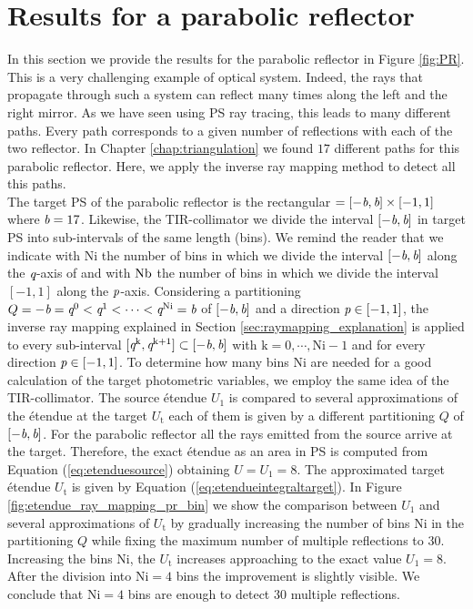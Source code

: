 \section{Results for a parabolic reflector}\label{sec:PR}
In this section we provide the results for the parabolic reflector in Figure \ref{fig:PR}.
This is a very challenging example of optical system. Indeed, the rays that propagate through such a system can reflect many times along the left and the right mirror. As we have seen using PS ray tracing, this leads to many different paths. Every path corresponds to a given number of reflections with each of the two reflector. In Chapter \ref{chap:triangulation} we found $17$ different paths for this parabolic reflector. Here, we apply the inverse ray mapping method to detect all this paths. \\ \indent
The target PS of the parabolic reflector is the rectangular $=[-\textit{b}, \textit{b}]\times[-1,1]$ where $\textit{b}=17$. Likewise, the TIR-collimator we divide the interval $[-\textit{b}, \textit{b}]$ in target PS into sub-intervals of the same length (bins). We remind the reader that we indicate with $\textrm{Ni}$ the number of bins in which we divide the interval $[-\textit{b}, \textit{b}]$ along the $\textit{q}$-axis of  and with $\textrm{Nb}$ the number of bins in which we divide the interval $[-1,1]$ along the $\textit{p}$-axis. Considering a partitioning $Q = -\textit{b}=\textit{q}^{0}<\textit{q}^{1}<\cdots<\textit{q}^{\textrm{Ni}}=\textit{b}$ of $[-\textit{b}, \textit{b}]$ and a direction $\textit{p}\in[-1,1]$, the inverse ray mapping explained in Section \ref{sec:raymapping_explanation} is applied to every sub-interval $[\textit{q}^{\textrm{k}}, \textit{q}^{\textrm{k+1}}]\subset[-\textit{b}, \textit{b}]$ with $\textrm{k}=0, \cdots, \textrm{Ni}-1$ and for every direction $\textit{p}\in[-1,1]$. To determine how many bins $\textrm{Ni}$ are needed for a good calculation of the target photometric variables, we employ the same idea of the TIR-collimator. The source \'{e}tendue $U_1$ is compared to several approximations of the \'{e}tendue at the target $U_{\textrm{t}}$ each of them is given by a different partitioning $Q$ of $[-\textit{b}, \textit{b}]$. For the parabolic reflector all the rays emitted from the source arrive at the target. Therefore, the exact \'{e}tendue as an area in PS is computed from Equation (\ref{eq:etenduesource}) obtaining $U=U_1=8$. The approximated target \'{e}tendue $U_{\textrm{t}}$ is given by Equation (\ref{eq:etendueintegraltarget}). In Figure \ref{fig:etendue_ray_mapping_pr_bin} we show the comparison between $U_1$ and several approximations of $U_{\textrm{t}}$ by gradually increasing the number of bins $\textrm{Ni}$ in the partitioning $Q$ while fixing the maximum number of multiple reflections to $30$. Increasing the bins $\textrm{Ni}$, the $U_{\textrm{t}}$ increases approaching to the exact value $U_1=8$. After the division into $\textrm{Ni}=4$ bins the improvement is slightly visible. We conclude that $\textrm{Ni}=4$ bins are enough to detect $30$ multiple reflections.
